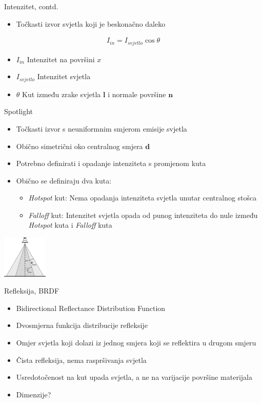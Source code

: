 \documentclass[9pt]{beamer}
\begin{document}
\begin{frame}{Intenzitet, contd.}
	\begin{itemize}
		\item Točkasti izvor svjetla koji je \alert{beskonačno} daleko
	\end{itemize}
	\begin{align*}
	I_{in} = I_{svjetlo}\cos \theta
	\end{align*}
	\begin{itemize}
		\item $I_{in}$ Intenzitet na površini $x$
		\item $I_{svjetlo}$ Intenzitet svjetla
		\item $\theta$ Kut između zrake svjetla $\mathbf{l}$ i normale površine $\mathbf{n}$
	\end{itemize}
\end{frame}

\begin{frame}{Spotlight}
	\begin{itemize} %
		\item Točkasti izvor s \alert{neuniformnim} smjerom emisije svjetla
		\item Obično simetrični oko centralnog smjera $\mathbf{d}$ 
		\item Potrebno definirati i opadanje intenziteta s promjenom kuta
		\item Obično se definiraju dva kuta:
		\begin{itemize}
			\item \textsl{Hotspot} kut: Nema opadanja intenziteta svjetla unutar centralnog stošca
			\item \textsl{Falloff} kut: Intenzitet svjetla opada od punog intenziteta do nule između \textsl{Hotspot} kuta i \textsl{Falloff} kuta
		\end{itemize}
	\end{itemize}
	\begin{center}
		\includegraphics[height=2cm]{slike/spotlight.jpg}
	\end{center}
\end{frame}

\begin{frame}{Refleksija, BRDF}
	\begin{itemize}%
		\item Bidirectional Reflectance Distribution Function
		\item Dvosmjerna funkcija distribucije refleksije
		\item Omjer svjetla koji dolazi iz jednog smjera koji se reflektira u drugom smjeru
		\item Čista refleksija, nema raspršivanja svjetla
		\item Usredotočenost na kut upada svjetla, a ne na varijacije površine materijala
		\item Dimenzije?
	\end{itemize}
\end{frame}
\end{document}
